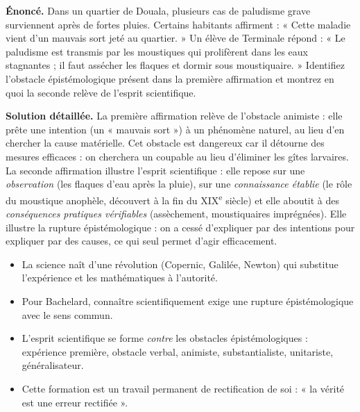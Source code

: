 \documentclass[11pt]{article}
\newcommand{\cle}[1]{{\popxbold\color{popdark}#1}}
\begin{document}
\begin{exoresolu}
\textbf{Énoncé.} Dans un quartier de Douala, plusieurs cas de paludisme grave surviennent après de fortes pluies. Certains habitants affirment : « Cette maladie vient d'un mauvais sort jeté au quartier. » Un élève de Terminale répond : « Le paludisme est transmis par les moustiques qui prolifèrent dans les eaux stagnantes ; il faut assécher les flaques et dormir sous moustiquaire. » Identifiez l'obstacle épistémologique présent dans la première affirmation et montrez en quoi la seconde relève de l'esprit scientifique.

\tcblower
\textbf{Solution détaillée.} La première affirmation relève de l'\cle{obstacle animiste} : elle prête une intention (un « mauvais sort ») à un phénomène naturel, au lieu d'en chercher la cause matérielle. Cet obstacle est dangereux car il détourne des mesures efficaces : on cherchera un coupable au lieu d'éliminer les gîtes larvaires. La seconde affirmation illustre l'esprit scientifique : elle repose sur une \emph{observation} (les flaques d'eau après la pluie), sur une \emph{connaissance établie} (le rôle du moustique anophèle, découvert à la fin du XIX\textsuperscript{e} siècle) et elle aboutit à des \emph{conséquences pratiques vérifiables} (assèchement, moustiquaires imprégnées). Elle illustre la \cle{rupture épistémologique} : on a cessé d'expliquer par des intentions pour expliquer par des causes, ce qui seul permet d'agir efficacement.
\end{exoresolu}

\begin{aretenir}
\begin{itemize}
\item La science naît d'une \cle{révolution} (Copernic, Galilée, Newton) qui substitue l'expérience et les mathématiques à l'autorité.
\item Pour Bachelard, connaître scientifiquement exige une \cle{rupture épistémologique} avec le sens commun.
\item L'esprit scientifique se forme \emph{contre} les \cle{obstacles épistémologiques} : expérience première, obstacle verbal, animiste, substantialiste, unitariste, généralisateur.
\item Cette formation est un travail permanent de rectification de soi : « la vérité est une erreur rectifiée ».
\end{itemize}
\end{aretenir}
\end{document}
